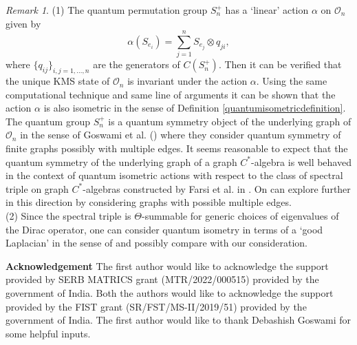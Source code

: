 \documentclass{amsart}
\theoremstyle{plain}
\theoremstyle{definition}
\theoremstyle{remark}
\newtheorem{remark}[subsection]{Remark}
\numberwithin{equation}{section}
\newcommand{\cal}{\mathcal}
\newcommand{\clo}{{\cal O}}
\begin{document}
\begin{remark}
(1) The quantum permutation group $S_{n}^{+}$ has a `linear' action $\alpha$ on $\clo_{n}$ given by 
  \begin{displaymath}
      \alpha(S_{e_{i}})=\sum_{j=1}^{n} S_{e_{j}}\otimes q_{ji},
  \end{displaymath}
  where $\{q_{ij}\}_{i,j=1,\ldots,n}$ are the generators of $C(S_{n}^{+})$. Then it can be verified that the unique KMS state of $\clo_{n}$ is invariant under the action $\alpha$. Using the same computational technique and same line of arguments it can be shown that the action $\alpha$ is also isometric in the sense of Definition \ref{quantumisometricdefinition}. The quantum group $S_{n}^{+}$ is a quantum symmetry object of the underlying graph of $\clo_{n}$ in the sense of Goswami et al. (\cite{asfaq}) where they consider quantum symmetry of finite graphs possibly with multiple edges. It seems reasonable to expect that the quantum symmetry of the underlying graph of a graph $C^{\ast}$-algebra is well behaved in the context of quantum isometric actions with respect to the class of spectral triple on graph $C^{\ast}$-algebras constructed by Farsi et al. in \cite{farsi}. On can explore further in this direction by considering graphs with possible multiple edges.\\
  \indent (2) Since the spectral triple is $\Theta$-summable for generic choices of eigenvalues of the Dirac operator, one can consider quantum isometry in terms of a `good Laplacian' in the sense of \cite{goswami2} and possibly compare with our consideration.
\end{remark}
{\bf Acknowledgement} The first author would like to acknowledge the support provided by SERB MATRICS grant (MTR/2022/000515) provided by the government of India. Both the authors would like to acknowledge the support provided by the FIST grant (SR/FST/MS-II/2019/51) provided by the government of India. The first author would like to thank Debashish Goswami for some helpful inputs.
\end{document}
